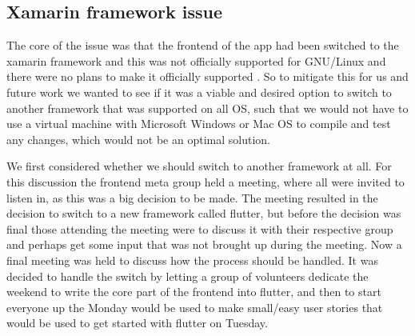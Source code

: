 \subsection{Xamarin framework issue}
The core of the issue was that the frontend of the app had been switched to the xamarin framework and this was not officially supported for GNU/Linux and there were no plans to make it officially supported \cite{xamarinSupport} \cite{xamarinSupport2}.
So to mitigate this for us and future work we wanted to see if it was a viable and desired option to switch to another framework that was supported on all OS, such that we would not have to use a virtual machine with Microsoft Windows or Mac OS to compile and test any changes, which would not be an optimal solution.

We first considered whether we should switch to another framework at all.
For this discussion the frontend meta group held a meeting, where all were invited to listen in, as this was a big decision to be made.
The meeting resulted in the decision to switch to a new framework called flutter, but before the decision was final those attending the meeting were to discuss it with their respective group and perhaps get some input that was not brought up during the meeting.
Now a final meeting was held to discuss how the process should be handled.
It was decided to handle the switch by letting a group of volunteers dedicate the weekend to write the core part of the frontend into flutter, and then to start everyone up the Monday would be used to make small/easy user stories that would be used to get started with flutter on Tuesday.
